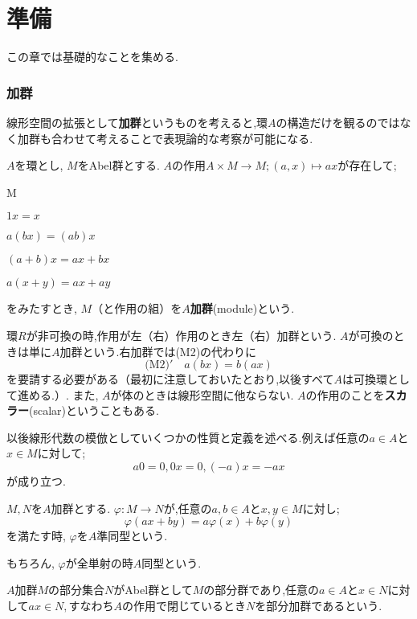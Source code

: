 \part[Preliminaries]{準備}
この章では基礎的なことを集める.

\section{加群}

線形空間の拡張として\textbf{加群}というものを考えると,環$A$の構造だけを観るのではなく加群も合わせて考えることで表現論的な考察が可能になる.

\begin{defi}[加群]
	$A$を環とし, $M$をAbel群とする. $A$の作用$A\times M\to M;(a,x)\mapsto ax$が存在して;
	\begin{defiterm}{M}
		\item $1x=x$
		\item $a(bx)=(ab)x$
		\item $(a+b)x=ax+bx$
		\item $a(x+y)=ax+ay$
	\end{defiterm}
	をみたすとき, $M$（と作用の組）を$A$\textbf{加群}(module)という.
\end{defi}

環$R$が非可換の時,作用が左（右）作用のとき左（右）加群という. $A$が可換のときは単に$A$加群という.右加群では(M2)の代わりに
\[\textrm{(M2)}'\quad a(bx)=b(ax)\]
を要請する必要がある（最初に注意しておいたとおり,以後すべて$A$は可換環として進める.）. また, $A$が体のときは線形空間に他ならない. $A$の作用のことを\textbf{スカラー}(scalar)ということもある.

以後線形代数の模倣としていくつかの性質と定義を述べる.例えば任意の$a\in A$と$x\in M$に対して;
\[a0=0,0x=0,(-a)x=-ax\]
が成り立つ.

\begin{defi}[準同型]
	$M,N$を$A$加群とする. $\varphi:M\to N$が,任意の$a,b\in A$と$x,y\in M$に対し;
	\[\varphi(ax+by)=a\varphi(x)+b\varphi(y)\]
	を満たす時, $\varphi$を$A$準同型という.
\end{defi}

もちろん, $\varphi$が全単射の時$A$同型という.

\begin{defi}[部分加群]
	$A$加群$M$の部分集合$N$がAbel群として$M$の部分群であり,任意の$a\in A$と$x\in N$に対して$ax\in N, $すなわち$A$の作用で閉じているとき$N$を部分加群であるという.
\end{defi}


